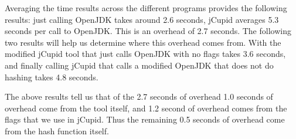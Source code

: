 Averaging the time results across the different programs provides the following
results: just calling OpenJDK takes around 2.6 seconds, jCupid averages 5.3 seconds
per call to OpenJDK. This is an overhead of 2.7 seconds. The following two results
will help us determine where this overhead comes from. With the modified jCupid tool
that just calls OpenJDK with no flags takes 3.6 seconds, and finally calling jCupid
that calls a modified OpenJDK that does not do hashing takes 4.8 seconds.

The above results tell us that of the 2.7 seconds of overhead 1.0 seconds of overhead
come from the tool itself, and 1.2 second of overhead comes from the flags that
we use in jCupid. Thus the remaining 0.5 seconds of overhead come from the hash
function itself.
